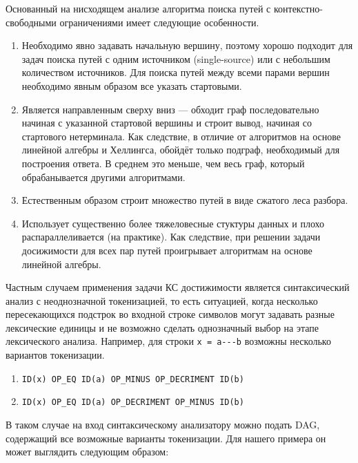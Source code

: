 Основанный на нисходящем анализе алгоритма поиска путей с контекстно-свободными ограничениями имеет следующие особенности.
\begin{enumerate}
  \item Необходимо явно задавать начальную вершину, поэтому хорошо подходит для задач поиска путей с одним источником (single-source) или с небольшим количеством источников. Для поиска путей между всеми парами вершин необходимо явным образом все указать стартовыми.
  \item Является направленным сверху вниз --- обходит граф последовательно начиная с указанной стартовой вершины и строит вывод, начиная со стартового нетерминала. Как следствие, в отличие от алгоритмов на основе линейной алгебры и Хеллингса, обойдёт только подграф, необходимый для построения ответа. В среднем это меньше, чем весь граф, который обрабанывается другими алгоритмами.
  \item Естественным образом строит множество путей в виде сжатого леса разбора.
  \item Использует существенно более тяжеловесные стуктуры данных и плохо распараллеливается (на практике). Как следствие, при решении задачи досижимости для всех пар путей проигрывает алгоритмам на основе линейной алгебры.
\end{enumerate}

Частным случаем применения задачи КС достижимости является синтаксический анализ с неоднозначной токенизацией, то есть ситуацией, когда несколько пересекающихся подстрок во входной строке символов могут задавать разные лексические единицы и не возможно сделать однозначный выбор на этапе лексического анализа.
Например, для строки \verb|x = a---b| возможны несколько вариантов токенизации.
\begin{enumerate}
  \item \verb|ID(x) OP_EQ ID(a) OP_MINUS OP_DECRIMENT ID(b)|
  \item \verb|ID(x) OP_EQ ID(a) OP_DECRIMENT OP_MINUS ID(b)|
\end{enumerate}

В таком случае на вход синтаксическому анализатору можно подать DAG, содержащий все возможные варианты токенизации. Для нашего примера он может выглядить следующим образом:

